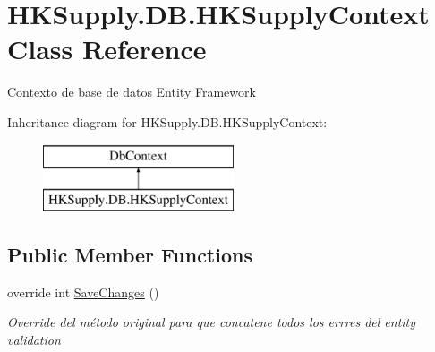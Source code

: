 \hypertarget{class_h_k_supply_1_1_d_b_1_1_h_k_supply_context}{}\section{H\+K\+Supply.\+D\+B.\+H\+K\+Supply\+Context Class Reference}
\label{class_h_k_supply_1_1_d_b_1_1_h_k_supply_context}


Contexto de base de datos Entity Framework  


Inheritance diagram for H\+K\+Supply.\+D\+B.\+H\+K\+Supply\+Context\+:\begin{figure}[H]
\begin{center}
\leavevmode
\includegraphics[height=2.000000cm]{class_h_k_supply_1_1_d_b_1_1_h_k_supply_context}
\end{center}
\end{figure}
\subsection*{Public Member Functions}
\begin{DoxyCompactItemize}
\item 
override int \hyperlink{class_h_k_supply_1_1_d_b_1_1_h_k_supply_context_a2a1188ce8fd98551e036cb87ae342132}{Save\+Changes} ()
\begin{DoxyCompactList}\small\item\em Override del método original para que concatene todos los errres del entity validation \end{DoxyCompactList}\end{DoxyCompactItemize}
